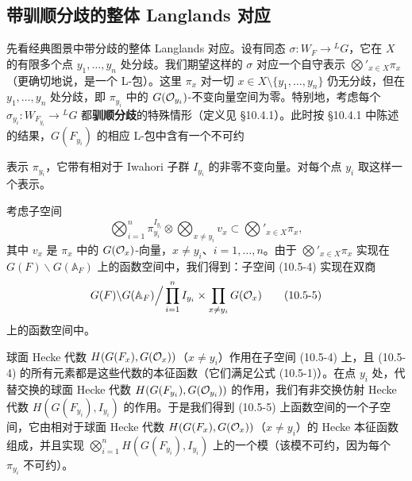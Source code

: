 \subsection{带驯顺分歧的整体 Langlands 对应}

先看经典图景中带分歧的整体 Langlands 对应。设有同态 $\sigma:W_F\to{}^L G$，它在 $X$ 的有限多个点 $y_1,\dots,y_n$ 处分歧。我们期望这样的 $\sigma$ 对应一个自守表示 $\bigotimes'_{x\in X}\pi_x$（更确切地说，是一个 L-包）。这里 $\pi_x$ 对一切 $x\in X\setminus\{y_1,\dots,y_n\}$ 仍无分歧，但在 $y_1,\dots,y_n$ 处分歧，即 $\pi_{y_i}$ 中的 $G(\mathcal{O}_{y_i})$-不变向量空间为零。特别地，考虑每个 $\sigma_{y_i}:W_{F_{y_i}}\to{}^L G$ 都\textbf{驯顺分歧}的特殊情形（定义见 §10.4.1）。此时按 §10.4.1 中陈述的结果，$G(F_{y_i})$ 的相应 L-包中含有一个不可约

表示 $\pi_{y_i}$，它带有相对于 Iwahori 子群 $I_{y_i}$ 的非零不变向量。对每个点 $y_i$ 取这样一个表示。

考虑子空间
\begin{equation}
    \bigotimes_{i=1}^n \pi_{y_i}^{I_{y_i}}
    \otimes \bigotimes_{x\neq y_i} v_x
    \subset \bigotimes{}'_{x\in X}\pi_x,
    \tag{10.5-4}
\end{equation}
其中 $v_x$ 是 $\pi_x$ 中的 $G(\mathcal{O}_x)$-向量，$x\neq y_i$、$i=1,\dots,n$。由于 $\bigotimes'_{x\in X}\pi_x$ 实现在 $G(F)\backslash G(\mathbb{A}_F)$ 上的函数空间中，我们得到：子空间 (10.5-4) 实现在双商
\begin{equation}
    G(F)\backslash G(\mathbb{A}_F)\Big/
    \prod_{i=1}^n I_{y_i}\times\prod_{x\neq y_i}G(\mathcal{O}_x)
    \tag{10.5-5}
\end{equation}
上的函数空间中。

球面 Hecke 代数 $H(G(F_x),G(\mathcal{O}_x))$（$x\neq y_i$）作用在子空间 (10.5-4) 上，且 (10.5-4) 的所有元素都是这些代数的本征函数（它们满足公式 (10.5-1)）。在点 $y_i$ 处，代替交换的球面 Hecke 代数 $H(G(F_{y_i}),G(\mathcal{O}_{y_i}))$ 的作用，我们有非交换仿射 Hecke 代数 $H(G(F_{y_i}),I_{y_i})$ 的作用。于是我们得到 (10.5-5) 上函数空间的一个子空间，它由相对于球面 Hecke 代数 $H(G(F_x),G(\mathcal{O}_x))$（$x\neq y_i$）的 Hecke 本征函数组成，并且实现 $\bigotimes_{i=1}^n H(G(F_{y_i}),I_{y_i})$ 上的一个模（该模不可约，因为每个 $\pi_{y_i}$ 不可约）。

